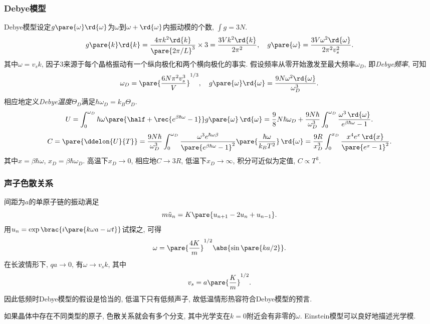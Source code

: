 \documentclass[../Thermal.tex]{subfiles}
\begin{document}
\subsubsection{Debye模型}
Debye模型设定$g\pare{\omega}\rd{\omega}$为$\omega$到$\omega+\rd{\omega}$内振动模的个数, $\int g = 3N$.
\[ g\pare{k}\rd{k} = \frac{4\pi k^2\rd{k}}{\pare{2\pi/L}^3}\times 3 = \frac{3Vk^2\rd{k}}{2\pi^2},\quad g\pare{\omega} = \frac{3V\omega^2\rd{\omega}}{2\pi^2v_s^2}. \]
其中$\omega = v_s k$, 因子$3$来源于每个晶格振动有一个纵向极化和两个横向极化的事实. 假设频率从零开始激发至最大频率$\omega_D$, 即\emph{Debye频率}, 可知
\[ \omega_D = \pare{\frac{6N\pi^2v_s^3}{V}}^{1/3},\quad g\pare{\omega}\rd{\omega} = \frac{9N\omega^2\rd{\omega}}{\omega_D^3}. \]
相应地定义\emph{Debye温度}$\Theta_D$满足$\hbar\omega_D = k_B\Theta_D$.
\[ U = \int_0^{\omega_D}\hbar\omega\pare{\half + \rec{e^{\beta\hbar\omega}-1}} g\pare{\omega}\,\rd{\omega} = \frac{9}{8}N\hbar\omega_D + \frac{9N\hbar}{\omega_D^3}\int_0^{\omega_D} \frac{\omega^3\,\rd{\omega}}{e^{\beta\hbar\omega} - 1}. \]
\[ C = \pare{\ddelon{U}{T}} = \frac{9N\hbar}{\omega_D^3}\int_0^{\omega_D}\frac{\omega^3e^{\hbar\omega\beta}}{\pare{e^{\beta\hbar\omega} - 1}^2}\pare{\frac{\hbar\omega}{k_BT^2}}\,\rd{\omega} = \frac{9R}{x_D^3}\int_0^{x_D}\frac{x^4e^x\,\rd{x}}{\pare{e^x-1}^2}. \]
其中$x=\beta\hbar\omega$, $x_D = \beta\hbar\omega_D$. 高温下$x_D\rightarrow 0$, 相应地$C\rightarrow 3R$, 低温下$x_D\rightarrow\infty$, 积分可近似为定值, $C\propto T^3$.
\subsubsection{声子色散关系}
间距为$a$的单原子链的振动满足
\[ m\ddot{u}_n = K\pare{u_{n+1} - 2u_n + u_{n-1}}. \]
用$u_n = \exp\brac{i\pare{k\omega a- \omega t}}$试探之, 可得
\[ \omega = \pare{\frac{4K}{m}}^{1/2}\abs{\sin\pare{ka/2}}. \]
在长波情形下, $qa\rightarrow 0$, 有$\omega\rightarrow v_s k$, 其中
\[ v_s = a\pare{\frac{K}{m}}^{1/2}. \]
因此低频时Debye模型的假设是恰当的, 低温下只有低频声子, 故低温情形热容符合Debye模型的预言.
\par
如果晶体中存在不同类型的原子, 色散关系就会有多个分支, 其中光学支在$k=0$附近会有非零的$\omega$. Einstein模型可以良好地描述光学模.
\end{document}
